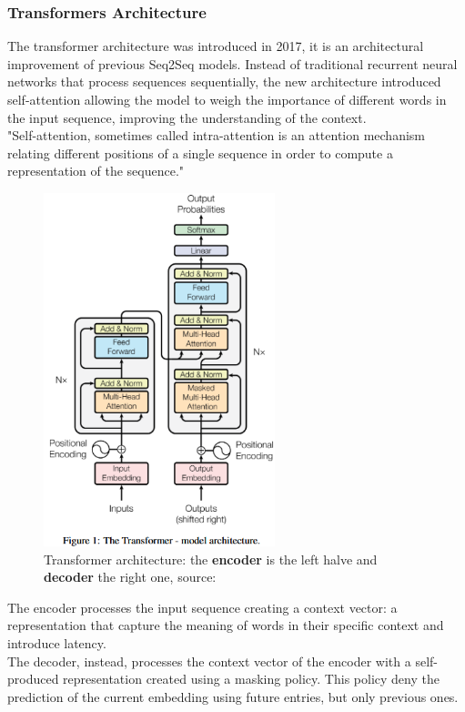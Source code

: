 \documentclass[12pt]{article}
\begin{document}
        \subsubsection{Transformers Architecture}
The transformer architecture was introduced in 2017, it is an architectural improvement of previous Seq2Seq models. Instead of traditional recurrent neural networks that process sequences sequentially, the new architecture introduced self-attention %
allowing the model to weigh the importance of different words in the input sequence, improving the understanding of the context.\\
"Self-attention, sometimes called intra-attention is an attention mechanism relating different positions of a single sequence in order to compute a representation of the sequence."\cite{vaswani2023attentionneed}\\
	\begin{figure}[H]
    \centering
            \includegraphics[width=0.6\textwidth]{transformer.png}
    \caption{Transformer architecture: the \textbf{encoder} is the left halve and \textbf{decoder} the right one, source: \cite{vaswani2023attentionneed}}
    \end{figure}
The encoder processes the input sequence creating a context vector: a representation that capture the meaning of words in their specific context and introduce latency.\\
The decoder, instead, processes the context vector of the encoder with a self-produced representation created using a masking policy. This policy deny the prediction of the current embedding using future entries, but only previous ones.
\end{document}
